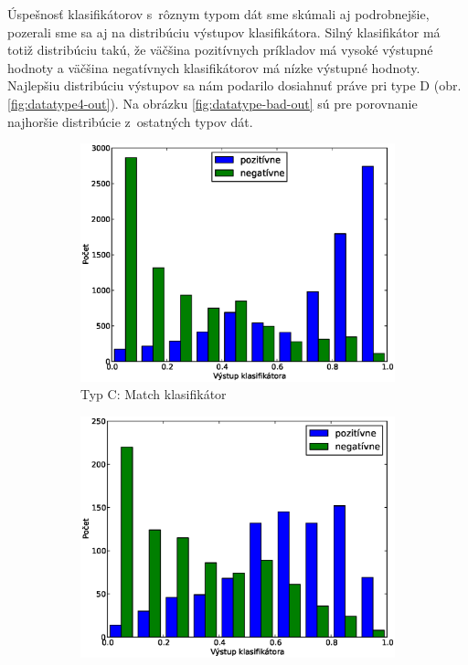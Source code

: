 Úspešnosť klasifikátorov s~rôznym typom dát sme skúmali aj podrobnejšie, pozerali sme sa aj na distribúciu výstupov klasifikátora. Silný klasifikátor má totiž distribúciu takú, že väčšina pozitívnych príkladov má vysoké výstupné hodnoty a väčšina negatívnych klasifikátorov má nízke výstupné hodnoty. Najlepšiu distribúciu výstupov sa nám podarilo dosiahnuť práve pri type D (obr. \ref{fig:datatype4-out}). Na obrázku \ref{fig:datatype-bad-out} sú pre porovnanie najhoršie distribúcie z~ostatných typov dát.
\begin{figure}[htbp]
        \centering
        \begin{subfigure}[t]{0.4\textwidth}
                \includegraphics[width=\textwidth]{images/clf_fi/randomforest_fullcmp_5_test}
                \caption{Typ C: Match klasifikátor}
                \label{fig:datatype1-out-m}
        \end{subfigure}%
        \qquad\qquad %
        \begin{subfigure}[t]{0.4\textwidth}
                \includegraphics[width=\textwidth]{images/clf_fi/randomforest5_indel_test}

\end{subfigure}
\end{figure}
